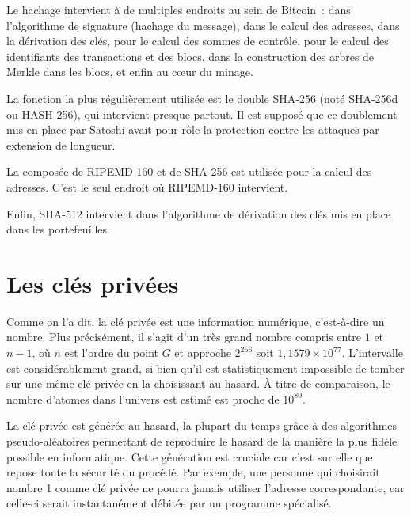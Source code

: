 Le hachage intervient à de multiples endroits au sein de Bitcoin~: dans l'algorithme de signature (hachage du message), dans le calcul des adresses, dans la dérivation des clés, pour le calcul des sommes de contrôle, pour le calcul des identifiants des transactions et des blocs, dans la construction des arbres de Merkle dans les blocs, et enfin au cœur du minage. 

La fonction la plus régulièrement utilisée est le double SHA-256 (noté SHA-256d ou HASH-256), qui intervient presque partout. Il est supposé que ce doublement mis en place par Satoshi avait pour rôle la protection contre les attaques par extension de longueur.

La composée de RIPEMD-160 et de SHA-256 est utilisée pour la calcul des adresses. C'est le seul endroit où RIPEMD-160 intervient.

Enfin, SHA-512 intervient dans l'algorithme de dérivation des clés mis en place dans les portefeuilles.

\section*{Les clés privées}

Comme on l'a dit, la clé privée est une information numérique, c'est-à-dire un nombre. Plus précisément, il s'agit d'un très grand nombre compris entre $1$ et $n-1$, où $n$ est l'ordre du point $G$ et approche $2^{256}$ soit $1,1579 \times 10^{77}$. L'intervalle est considérablement grand, si bien qu'il est statistiquement impossible de tomber sur une même clé privée en la choisissant au hasard. À titre de comparaison, le nombre d'atomes dans l'univers est estimé est proche de $10^{80}$. 


La clé privée est générée au hasard, la plupart du temps grâce à des algorithmes pseudo-aléatoires permettant de reproduire le hasard de la manière la plus fidèle possible en informatique. Cette génération est cruciale car c'est sur elle que repose toute la sécurité du procédé. Par exemple, une personne qui choisirait nombre 1 comme clé privée ne pourra jamais utiliser l'adresse correspondante, car celle-ci serait instantanément débitée par un programme spécialisé.

